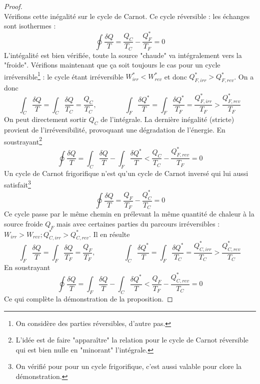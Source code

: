 	\begin{proof}\ \\
	Vérifions cette inégalité sur le cycle de Carnot. Ce cycle réversible : les 
	échanges sont isothermes :
	\begin{equation}
	\oint \dfrac{\delta Q}{T} = \dfrac{Q_C}{T_C} - \dfrac{Q_F^*}{T_F} = 0
	\end{equation}
	L'intégalité est bien vérifiée, toute la source "chaude" va intégralement vers 
	la "froide". Vérifions maintenant que ça soit toujours le 
	cas pour un cycle irréversible\footnote{On considère des parties réversibles, 
	d'autre pas.} : le cycle étant irréversible $W_{irr}^* < W_{rev}^*$ et donc 
	$Q_{F,irr}^* > Q_{F,rev}^*$. On a donc 
	\begin{equation}
	\int_C \dfrac{\delta Q}{T} = \int_C \dfrac{\delta Q}{T_C} = \dfrac{Q_C}{T_C}, 
	\qquad\qquad
	\int_F \dfrac{\delta Q^*}{T} = \int_F \dfrac{\delta Q^*}{T_F} = \dfrac{Q_{F,irr}^*}{T_F} 
	> \dfrac{Q_{F,rev}^*}{T_F} 
	\end{equation}
	On peut directement sortir $Q_C$ de l'intégrale. La dernière inégalité (stricte) 
	provient de l'irréversibilité, provoquant une dégradation de l'énergie. En 
	soustrayant\footnote{L'idée est de faire "apparaître" la relation pour le cycle 
	de Carnot réversible qui est bien nulle en "minorant" l'intégrale.}
	\begin{equation}
	\oint \dfrac{\delta Q}{T} = \int_C \dfrac{\delta Q}{T}-\int_F\dfrac{\delta Q^*}{T} 
	< \dfrac{Q_C}{T_C}-\dfrac{Q_{F,rev}^*}{T_F} = 0
	\end{equation}
	Un cycle de Carnot frigorifique n'est qu'un cycle de Carnot inversé qui lui 
	aussi satisfait\footnote{On vérifié pour pour un cycle frigorifique, c'est 
	aussi valable pour clore la démonstration.}
	\begin{equation}
	\oint \dfrac{\delta Q}{T} = \dfrac{Q_F}{T_F}-\dfrac{Q_C^*}{T_C} = 0
	\end{equation}
	Ce cycle passe par le même chemin en prélevant la même quantité de chaleur à la 
	source froide $Q_F$ mais avec certaines parties du parcours irréversibles : 
	$W_{irr} > W_{rev} ; Q_{C,irr}^* > Q_{C,rev}^*$. Il en résulte
	\begin{equation}
	\int_F \dfrac{\delta Q}{T} = \int_F \dfrac{\delta Q}{T_F} = \dfrac{Q_F}{T_F}, 
	\qquad\qquad
	\int_C \dfrac{\delta Q^*}{T} = \int_F \dfrac{\delta Q^*}{T_C} = \dfrac{Q_{C,irr}^*}{T_C} 
	> \dfrac{Q_{C,rev}^*}{T_C} 
	\end{equation}
	En 	soustrayant
	\begin{equation}
	\oint \dfrac{\delta Q}{T} = \int_F \dfrac{\delta Q}{T}-\int_C\dfrac{\delta Q^*}{T} 
	< \dfrac{Q_F}{T_F}-\dfrac{Q_{C,rev}^*}{T_C} = 0
	\end{equation}
	Ce qui complète la démonstration de la proposition.
	\end{proof}
	

